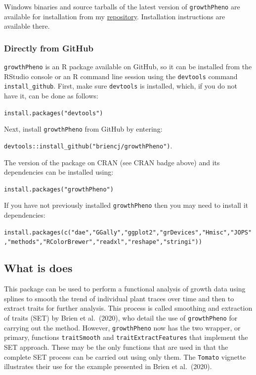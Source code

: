 \documentclass[
]{article}
\begin{document}
Windows binaries and source tarballs of the latest version of
\texttt{growthPheno} are available for installation from my
\href{http://chris.brien.name/rpackages}{repository}. Installation
instructions are available there.

\subsubsection{Directly from GitHub}\label{directly-from-github}

\texttt{growthPheno} is an R package available on GitHub, so it can be
installed from the RStudio console or an R command line session using
the \texttt{devtools} command \texttt{install\_github}. First, make sure
\texttt{devtools} is installed, which, if you do not have it, can be
done as follows:

\texttt{install.packages("devtools")}

Next, install \texttt{growthPheno} from GitHub by entering:

\texttt{devtools::install\_github("briencj/growthPheno")}.

The version of the package on CRAN (see CRAN badge above) and its
dependencies can be installed using:

\texttt{install.packages("growthPheno")}

If you have not previously installed \texttt{growthPheno} then you may
need to install it dependencies:

\texttt{install.packages(c("dae","GGally","ggplot2","grDevices","Hmisc","JOPS","methods","RColorBrewer","readxl","reshape","stringi"))}

\subsection{What is does}\label{what-is-does}

This package can be used to perform a functional analysis of growth data
using splines to smooth the trend of individual plant traces over time
and then to extract traits for further analysis. This process is called
smoothing and extraction of traits (SET) by Brien et al.~(2020), who
detail the use of \texttt{growthPheno} for carrying out the method.
However, \texttt{growthPheno} now has the two wrapper, or primary,
functions \texttt{traitSmooth} and \texttt{traitExtractFeatures} that
implement the SET approach. These may be the only functions that are
used in that the complete SET process can be carried out using only
them. The \texttt{Tomato} vignette illustrates their use for the example
presented in Brien et al.~(2020).
\end{document}
